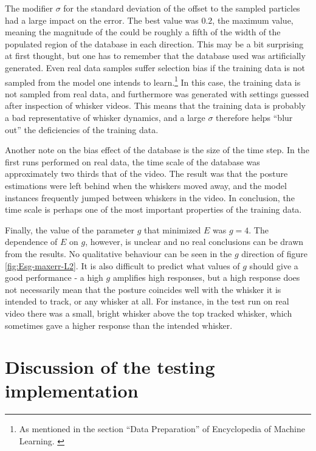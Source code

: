 The modifier $\sigma$ for the standard deviation of the offset to the
sampled particles had a large impact on the error. The best value was
$0.2$, the maximum value, meaning the magnitude of the could be
roughly a fifth of the width of the populated region of the database
in each direction. This may be a bit surprising at first thought, but
one has to remember that the database used was artificially
generated. Even real data samples suffer selection bias if the
training data is not sampled from the model one intends to
learn.\footnote{As mentioned in the section ``Data Preparation'' of
  Encyclopedia of Machine Learning. \cite{EncyclopediaMachineLearning}}
In this case, the training data is not sampled from real data, and
furthermore was generated with settings guessed after inspection of
whisker videos. This means that the training data is probably a bad
representative of whisker dynamics, and a large $\sigma$ therefore
helps ``blur out'' the deficiencies of the training data.

Another note on the bias effect of the database is the size of the
time step. In the first runs performed on real data, the time scale of
the database was approximately two thirds that of the video. The
result was that the posture estimations were left behind when the
whiskers moved away, and the model instances frequently jumped between
whiskers in the video. In conclusion, the time scale is perhaps one of
the most important properties of the training data.

Finally, the value of the parameter $g$ that minimized $E$ was $g=4$. The
dependence of $E$ on $g$, however, is unclear and no real conclusions
can be drawn from the results. No qualitative behaviour can be seen in
the $g$ direction of figure \ref{fig:Esg-maxerr-L2}. It is also difficult
to predict what values of $g$ should give a good performance - a high
$g$ amplifies high responses, but a high response does not necessarily
mean that the posture coincides well with the whisker it is intended
to track, or any whisker at all. For instance, in the test run on real
video there was a small, bright whisker above the top tracked whisker,
which sometimes gave a higher response than the intended whisker.







\section{Discussion of the testing implementation}

